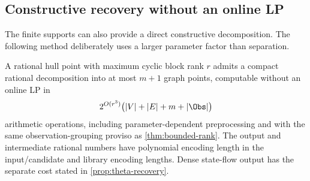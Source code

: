 \subsection{Constructive recovery without an online LP}\label{subsec:rank-recovery}
The finite supports can also provide a direct constructive decomposition.
The following method deliberately uses a larger parameter factor than
separation.

\begin{theorem}\label{thm:rank-recovery}
A rational hull point with maximum cyclic block rank $r$ admits a
compact rational decomposition into at most $m+1$ graph points, computable
without an online LP in
\begin{equation}\label{eq:rank-recovery-complexity}
 2^{O(r^3)}\bigl(|V|+|E|+m+|\Obs|\bigr)
\end{equation}
arithmetic operations, including parameter-dependent preprocessing and
with the same observation-grouping proviso as
\cref{thm:bounded-rank}. The output and intermediate rational numbers
have polynomial encoding length in the input/candidate and library
encoding lengths. Dense state-flow output has the separate cost stated
in \cref{prop:theta-recovery}.
\end{theorem}
